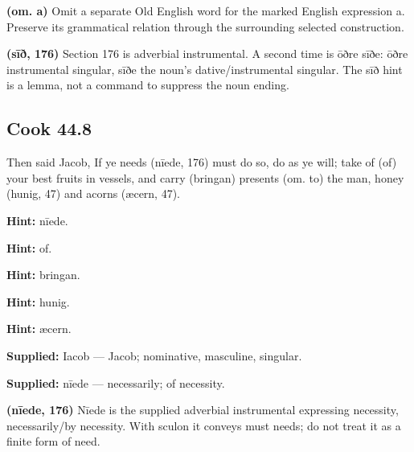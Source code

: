 \textbf{(om. a)} Omit a separate Old English word for the marked English expression a. Preserve its grammatical relation through the surrounding selected construction.

\textbf{(sīð, 176)} Section 176 is adverbial instrumental. A second time is ōðre sīðe: ōðre instrumental singular, sīðe the noun’s dative/\allowbreak{}instrumental singular. The sīð hint is a lemma, not a command to suppress the noun ending.

\par\begin{minipage}{\linewidth}\raggedright
\subsection*{Cook 44.8}

Then said Jacob, If ye needs (nīede, 176) must do so, do as ye will; take of (of) your best fruits in vessels, and carry (bringan) presents (om. to) the man, honey (hunig, 47) and acorns (æcern, 47).

\textbf{Hint:} nīede.

\textbf{Hint:} of.

\textbf{Hint:} bringan.

\textbf{Hint:} hunig.

\textbf{Hint:} æcern.

\textbf{Supplied:} Iacob — Jacob; nominative, masculine, singular.

\end{minipage}\par\addvspace{4pt}

\textbf{Supplied:} nīede — necessarily; of necessity.

\textbf{(nīede, 176)} Nīede is the supplied adverbial instrumental expressing necessity, necessarily/\allowbreak{}by necessity. With sculon it conveys must needs; do not treat it as a finite form of need.

